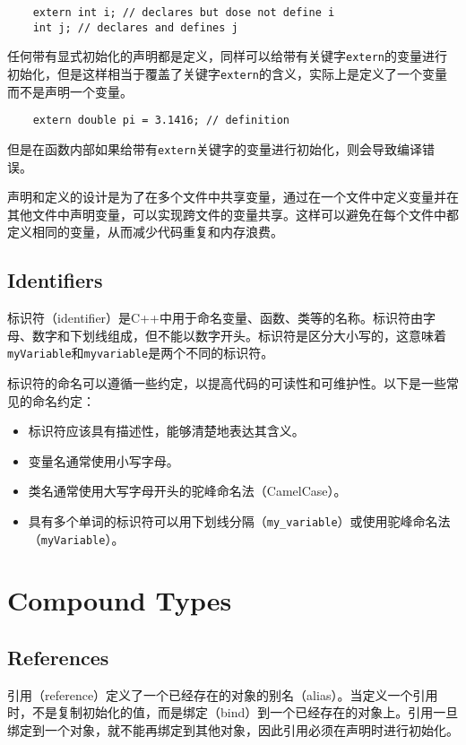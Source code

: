 \begin{verbatim}
    extern int i; // declares but dose not define i
    int j; // declares and defines j
\end{verbatim}

任何带有显式初始化的声明都是定义，同样可以给带有关键字\texttt{extern}的变量进行初始化，但是这样相当于覆盖了关键字\texttt{extern}的含义，实际上是定义了一个变量而不是声明一个变量。

\begin{verbatim}
    extern double pi = 3.1416; // definition
\end{verbatim}

但是在函数内部如果给带有\texttt{extern}关键字的变量进行初始化，则会导致编译错误。

声明和定义的设计是为了在多个文件中共享变量，通过在一个文件中定义变量并在其他文件中声明变量，可以实现跨文件的变量共享。这样可以避免在每个文件中都定义相同的变量，从而减少代码重复和内存浪费。

\subsection{Identifiers}
标识符（identifier）是C++中用于命名变量、函数、类等的名称。标识符由字母、数字和下划线组成，但不能以数字开头。标识符是区分大小写的，这意味着\texttt{myVariable}和\texttt{myvariable}是两个不同的标识符。

标识符的命名可以遵循一些约定，以提高代码的可读性和可维护性。以下是一些常见的命名约定：

\begin{itemize}
    \item 标识符应该具有描述性，能够清楚地表达其含义。
    \item 变量名通常使用小写字母。
    \item 类名通常使用大写字母开头的驼峰命名法（CamelCase）。
    \item 具有多个单词的标识符可以用下划线分隔（\texttt{my_variable}）或使用驼峰命名法（\texttt{myVariable}）。
\end{itemize}

\section{Compound Types}
\subsection{References}
引用（reference）定义了一个已经存在的对象的别名（alias）。当定义一个引用时，不是复制初始化的值，而是绑定（bind）到一个已经存在的对象上。引用一旦绑定到一个对象，就不能再绑定到其他对象，因此引用必须在声明时进行初始化。


